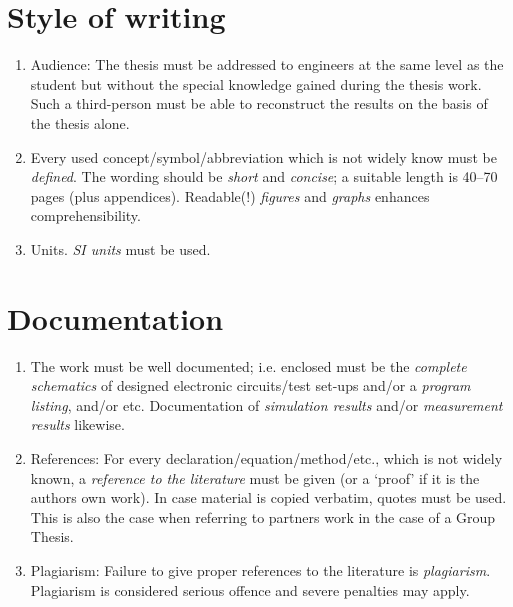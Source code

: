 \section{Style of writing}

\begin{enumerate}

\item Audience:
The thesis must be addressed to engineers at the same level as the
student but without the special knowledge gained during the thesis work.
Such a third-person must be able to reconstruct the results on the basis
of the thesis alone.

\item
Every used concept/symbol/abbreviation which is not widely know must be \emph{defined}.
The wording should be \emph{short} and \emph{concise};  a suitable length
is 40--70 pages (plus appendices).
Readable(!) \emph{figures} and \emph{graphs} enhances comprehensibility.

\item Units.
\emph{SI units} must be used.
\end{enumerate}

\section{Documentation}

\begin{enumerate}
\item
The work must be well documented; i.e. enclosed must be the \emph{complete
schematics} of designed electronic circuits/test set-ups and/or a
\emph{program listing}, and/or etc.
Documentation of \emph{simulation results} and/or \emph{measurement
results} likewise.
\item References:
For every declaration/equation/method/etc., which is not widely known,
a \emph{reference to the literature} must be given (or a `proof' if it is
the authors own work).
In case material is copied verbatim, quotes must be used.
This is also the case when referring to partners
work in the case of a Group Thesis.

\item Plagiarism:
Failure to give proper references to the literature is \emph{plagiarism}.
Plagiarism is considered serious offence and severe penalties may apply.

\end{enumerate}

